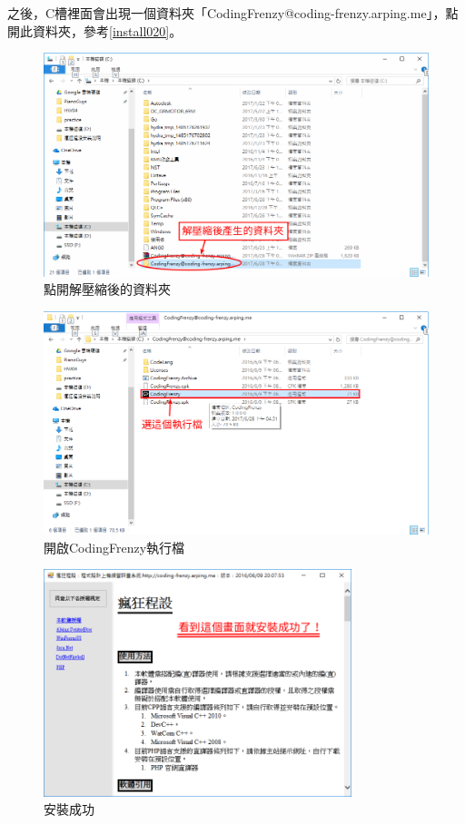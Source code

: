 		之後，C槽裡面會出現一個資料夾「CodingFrenzy@coding-frenzy.arping.me」，點開此資料夾，參考\autoref{install020}。
		\begin{figure}[H]
			\centering
			\includegraphics[width=\textwidth]{fig/install_and_setting/install_020}
			\caption{點開解壓縮後的資料夾}
			\label{install020}
		\end{figure}
		\begin{figure}[H]
			\centering
			\includegraphics[width=\textwidth]{fig/install_and_setting/install_021}
			\caption{開啟CodingFrenzy執行檔}
		\end{figure}
		\begin{figure}[H]
			\centering
			\includegraphics[width=0.8\textwidth]{fig/install_and_setting/install_022}
			\caption{安裝成功}
		\end{figure}

